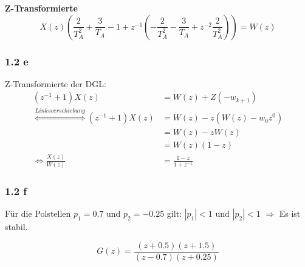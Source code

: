 \documentclass[a4paper]{scrartcl}
\begin{document}
  \textbf{Z-Transformierte}
  \[X(z) (\frac{2}{T_A^2} + \frac{3}{T_A} - 1 + z^{-1} (- \frac{2}{T_A^2} - \frac{3}{T_A} + z^{-2} \frac{2}{T_A^2})) = W(z)\]

  \subsubsection*{1.2 e}
  Z-Transformierte der DGL:
  \begin{align}
      (z^{-1} + 1) X(z) &= W(z) + Z(-w_{k+1})\\
      \overset{Linksverschiebung}{\Leftrightarrow} (z^{-1} + 1) X(z) &= W(z) - z(W(z) - w_0 z^0)\\
      &= W(z)- z W(z)\\
      &= W(z) (1-z)\\
      \Leftrightarrow \frac{X(z)}{W(z)} &= \frac{1-z}{1+z^{-1}}
  \end{align}

  \subsubsection*{1.2 f}
  Für die Polstellen $p_1 = 0.7$ und $p_2 = -0.25$ gilt: $|p_1| < 1$ und $|p_2| < 1$
  $\Rightarrow$ Es ist stabil.

  \[G(z) = \frac{(z+0.5)(z+1.5)}{(z-0.7) (z+0.25)}\]
\end{document}
